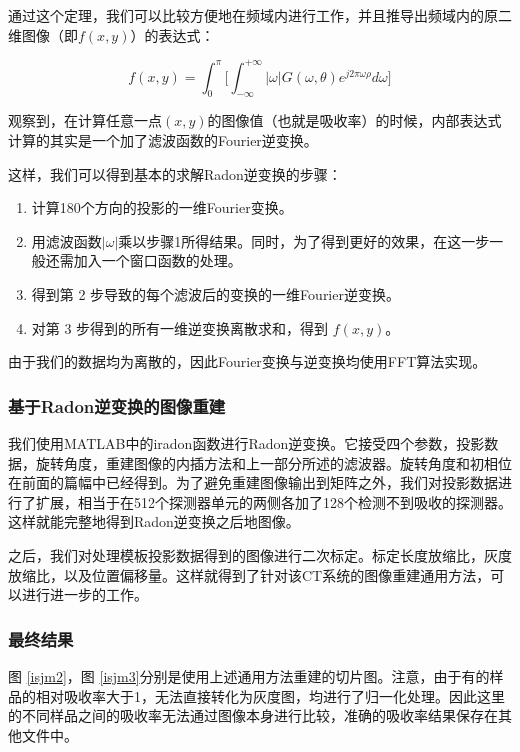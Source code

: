 \documentclass[withoutpreface,bwprint]{cumcmthesis} %
\begin{document}
      通过这个定理，我们可以比较方便地在频域内进行工作，并且推导出频域内的原二维图像（即$f(x, y)$）的表达式：

      \begin{equation}
        f(x, y) = \int_0^{\pi}\Bigg[\int_{-\infty}^{+\infty}|\omega|G(\omega, \theta)e^{j2\pi\omega\rho}d\omega\Bigg]
      \end{equation}

      观察到，在计算任意一点$(x, y)$的图像值（也就是吸收率）的时候，内部表达式计算的其实是一个加了滤波函数的Fourier逆变换。

      这样，我们可以得到基本的求解Radon逆变换的步骤：
      \begin{enumerate}
        \item 计算180个方向的投影的一维Fourier变换。
        \item 用滤波函数$|\omega|$乘以步骤1所得结果。同时，为了得到更好的效果，在这一步一般还需加入一个窗口函数的处理。
        \item 得到第 2 步导致的每个滤波后的变换的一维Fourier逆变换。
        \item 对第 3 步得到的所有一维逆变换离散求和，得到 $f(x, y)$。
      \end{enumerate}

      由于我们的数据均为离散的，因此Fourier变换与逆变换均使用FFT算法实现。

    \subsubsection{基于Radon逆变换的图像重建}

      我们使用MATLAB中的iradon函数进行Radon逆变换。它接受四个参数，投影数据，旋转角度，重建图像的内插方法和上一部分所述的滤波器。旋转角度和初相位在前面的篇幅中已经得到。为了避免重建图像输出到矩阵之外，我们对投影数据进行了扩展，相当于在512个探测器单元的两侧各加了128个检测不到吸收的探测器。这样就能完整地得到Radon逆变换之后地图像。

      之后，我们对处理模板投影数据得到的图像进行二次标定。标定长度放缩比，灰度放缩比，以及位置偏移量。这样就得到了针对该CT系统的图像重建通用方法，可以进行进一步的工作。

    \subsubsection{最终结果}

      图 \ref{isjm2}，图 \ref{isjm3}分别是使用上述通用方法重建的切片图。注意，由于有的样品的相对吸收率大于1，无法直接转化为灰度图，均进行了归一化处理。因此这里的不同样品之间的吸收率无法通过图像本身进行比较，准确的吸收率结果保存在其他文件中。
\end{document}
